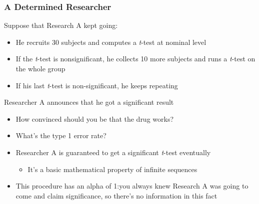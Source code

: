 \documentclass[10pt, block=fill]{beamer}
\begin{document}
\begin{frame}
   \frametitle{A Determined Researcher}
   
   Suppose that Research A kept going:
   \begin{itemize}
       \item He recruits 30 subjects and computes a \textit{t}-test at nominal level
       \item If the \textit{t}-test is nonsignificant, he collects 10 more subjects and runs a \textit{t}-test on the whole group
       \item If his last \textit{t}-test is non-significant, he keeps repeating 
   \end{itemize}
   
   \begin{exampleblock}{Researcher A announces that he got a significant result}
   \begin{itemize}
       \item How convinced should you be that the drug works?
       \item What's the type 1 error rate?
   \end{itemize}
   \end{exampleblock}

   \begin{itemize}
       \item Researcher A is guaranteed to get a significant \textit{t}-test eventually
       \begin{itemize}
           \item It's a basic mathematical property of infinite sequences
       \end{itemize}
       \item This procedure has an alpha of 1:you always knew Research A was going to come and claim significance, so there's no information in this fact
   \end{itemize}
\end{frame}
\end{document}
